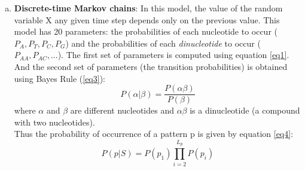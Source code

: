 \documentclass[10pt,twocolumn,letterpaper]{article}
\begin{document}
{\begin{itemize}
{\begin{enumerate}[i.]
\begin{enumerate}[a.]
               \item \textbf{Discrete-time Markov chains}: In this model, the value of the random variable X any given time step depends only on the previous value.
               This model has 20 parameters: the probabilities of each nucleotide to occur (\(P_A, P_T, P_C, P_G\)) and the probabilities of each \textit{dinucleotide} to occur (\(P_{AA}, P_{AC}, ...\)).
               The first set of parameters is computed using equation \ref{eq1}.
               And the second set of parameters (the transition probabilities) is obtained \cite{singh} using Bayes Rule (\ref{eq3}):\\
               \begin{equation}
                   P(\alpha|\beta) = \frac{P(\alpha \beta)}{P(\beta)}
                \label{eq3}
               \end{equation}
               where \(\alpha\) and \(\beta\) are different nucleotides and \(\alpha \beta \) is a dinucleotide (a compound with two nucleotides).\\ 
               Thus the probability of occurrence of a pattern p is given by equation \ref{eq4}:
               \begin{equation}
                   P(p|S) = P(p_1)\prod_{i=2}^{L_p} P(p_i)
                \label{eq4}
               \end{equation}
               \end{enumerate}
       \end{enumerate}
   }
    \end{itemize}
 }

\end{document}
